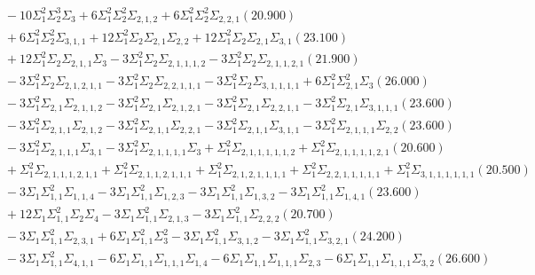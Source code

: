 \documentclass[12pt]{article}
\begin{document}
\begin{landscape}
\begin{align*}
		&\quad\quad -10\Sigma_{1}^{2}\Sigma_{2}^{3}\Sigma_{3}+6\Sigma_{1}^{2}\Sigma_{2}^{2}\Sigma_{2,1,2}+6\Sigma_{1}^{2}\Sigma_{2}^{2}\Sigma_{2,2,1}(20.900) \\ 
		&\quad\quad +6\Sigma_{1}^{2}\Sigma_{2}^{2}\Sigma_{3,1,1}+12\Sigma_{1}^{2}\Sigma_{2}\Sigma_{2,1}\Sigma_{2,2}+12\Sigma_{1}^{2}\Sigma_{2}\Sigma_{2,1}\Sigma_{3,1}(23.100) \\ 
		&\quad\quad +12\Sigma_{1}^{2}\Sigma_{2}\Sigma_{2,1,1}\Sigma_{3}-3\Sigma_{1}^{2}\Sigma_{2}\Sigma_{2,1,1,1,2}-3\Sigma_{1}^{2}\Sigma_{2}\Sigma_{2,1,1,2,1}(21.900) \\ 
		&\quad\quad -3\Sigma_{1}^{2}\Sigma_{2}\Sigma_{2,1,2,1,1}-3\Sigma_{1}^{2}\Sigma_{2}\Sigma_{2,2,1,1,1}-3\Sigma_{1}^{2}\Sigma_{2}\Sigma_{3,1,1,1,1}+6\Sigma_{1}^{2}\Sigma_{2,1}^{2}\Sigma_{3}(26.000) \\ 
		&\quad\quad -3\Sigma_{1}^{2}\Sigma_{2,1}\Sigma_{2,1,1,2}-3\Sigma_{1}^{2}\Sigma_{2,1}\Sigma_{2,1,2,1}-3\Sigma_{1}^{2}\Sigma_{2,1}\Sigma_{2,2,1,1}-3\Sigma_{1}^{2}\Sigma_{2,1}\Sigma_{3,1,1,1}(23.600) \\ 
		&\quad\quad -3\Sigma_{1}^{2}\Sigma_{2,1,1}\Sigma_{2,1,2}-3\Sigma_{1}^{2}\Sigma_{2,1,1}\Sigma_{2,2,1}-3\Sigma_{1}^{2}\Sigma_{2,1,1}\Sigma_{3,1,1}-3\Sigma_{1}^{2}\Sigma_{2,1,1,1}\Sigma_{2,2}(23.600) \\ 
		&\quad\quad -3\Sigma_{1}^{2}\Sigma_{2,1,1,1}\Sigma_{3,1}-3\Sigma_{1}^{2}\Sigma_{2,1,1,1,1}\Sigma_{3}+\Sigma_{1}^{2}\Sigma_{2,1,1,1,1,1,2}+\Sigma_{1}^{2}\Sigma_{2,1,1,1,1,2,1}(20.600) \\ 
		&\quad\quad +\Sigma_{1}^{2}\Sigma_{2,1,1,1,2,1,1}+\Sigma_{1}^{2}\Sigma_{2,1,1,2,1,1,1}+\Sigma_{1}^{2}\Sigma_{2,1,2,1,1,1,1}+\Sigma_{1}^{2}\Sigma_{2,2,1,1,1,1,1}+\Sigma_{1}^{2}\Sigma_{3,1,1,1,1,1,1}(20.500) \\ 
		&\quad\quad -3\Sigma_{1}\Sigma_{1,1}^{2}\Sigma_{1,1,4}-3\Sigma_{1}\Sigma_{1,1}^{2}\Sigma_{1,2,3}-3\Sigma_{1}\Sigma_{1,1}^{2}\Sigma_{1,3,2}-3\Sigma_{1}\Sigma_{1,1}^{2}\Sigma_{1,4,1}(23.600) \\ 
		&\quad\quad +12\Sigma_{1}\Sigma_{1,1}^{2}\Sigma_{2}\Sigma_{4}-3\Sigma_{1}\Sigma_{1,1}^{2}\Sigma_{2,1,3}-3\Sigma_{1}\Sigma_{1,1}^{2}\Sigma_{2,2,2}(20.700) \\ 
		&\quad\quad -3\Sigma_{1}\Sigma_{1,1}^{2}\Sigma_{2,3,1}+6\Sigma_{1}\Sigma_{1,1}^{2}\Sigma_{3}^{2}-3\Sigma_{1}\Sigma_{1,1}^{2}\Sigma_{3,1,2}-3\Sigma_{1}\Sigma_{1,1}^{2}\Sigma_{3,2,1}(24.200) \\ 
		&\quad\quad -3\Sigma_{1}\Sigma_{1,1}^{2}\Sigma_{4,1,1}-6\Sigma_{1}\Sigma_{1,1}\Sigma_{1,1,1}\Sigma_{1,4}-6\Sigma_{1}\Sigma_{1,1}\Sigma_{1,1,1}\Sigma_{2,3}-6\Sigma_{1}\Sigma_{1,1}\Sigma_{1,1,1}\Sigma_{3,2}(26.600) \\ 

\end{align*}
\end{landscape}
\end{document}
